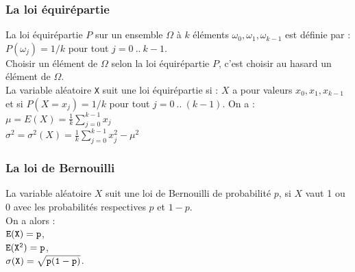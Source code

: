 \documentclass[a4paper,11pt]{book}
\begin{document}
\subsubsection{La loi \'equir\'epartie}
La loi \'equir\'epartie $P$ sur un ensemble $\Omega$ \`a $k$ \'el\'ements
$\omega_0,\omega_1,\omega_{k-1}$ est d\'efinie par : $P(\omega_j)=1/k$ pour 
tout $j=0\ ..\ k-1$.\\
Choisir un \'el\'ement de $\Omega$ selon la loi \'equir\'epartie $P$, c'est 
choisir au hasard un \'el\'ement de $\Omega$.\\
La variable al\'eatoire {\tt X} suit une loi \'equir\'epartie si :
$X$ a pour valeurs $ x_0,x_1,x_{k-1}$ et si $ P(X=x_j)=1/k$ pour tout 
$j=0\ ..\ (k-1)$.
On a :\\
$\mu=E(X)=\frac{1}{k}\sum _{j=0}^{k-1}x_j$  \\
$\sigma^2=\sigma^2(X)=\frac{1}{k}\sum _{j=0}^{k-1}x_j^2-\mu^2$\\


\subsubsection{La loi de Bernouilli}
La variable al\'eatoire $X$ suit une loi de Bernouilli de probabilit\'e 
$p$, si  $X$ vaut 
1 ou 0 avec les probabilit\'es respectives $p$ et $1-p$.\\
On a alors :\\
${\tt E(X)=p}$,\\
${\tt E(X^2)=p}$,\\
${\tt \sigma(X)=\sqrt{p(1-p)}}$.
\end{document}
